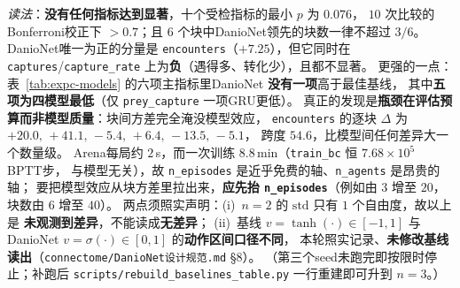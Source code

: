 \begin{table}[H]
  \centering
  \caption{块内置换检验（块 $=$ (seed, episode) 共 $6$ 个；同块内四模型共享同一出生布局与
  猎物游走，故\textbf{块内置换模型标签}在强零假设下精确；$2\times10^{4}$ 次重抽样，
  $p$ 为蒙特卡洛估计，同量级差异属抽样噪声）。
  $\Delta$ 为DanioNet减去其余三基线的均值；\emph{更高的块}为 $6$ 块中DanioNet领先的块数。}
  \label{tab:expc}
  \footnotesize
\setlength{\tabcolsep}{3pt}
\end{table}

\emph{读法}：\textbf{没有任何指标达到显著}，十个受检指标的最小 $p$ 为 $0.076$，
$10$ 次比较的Bonferroni校正下 $>0.7$；且 $6$ 个块中DanioNet领先的块数一律不超过 $3/6$。
DanioNet唯一为正的分量是 \texttt{encounters}（$+7.25$），但它同时在
\texttt{captures}/\texttt{capture\_rate} 上为\textbf{负}（遇得多、转化少），且都不显著。
更强的一点：表~\ref{tab:expc-models} 的六项主指标里DanioNet \textbf{没有一项}高于最佳基线，
其中\textbf{五项为四模型最低}（仅 \texttt{prey\_capture} 一项GRU更低）。
真正的发现是\textbf{瓶颈在评估预算而非模型质量}：块间方差完全淹没模型效应，
\texttt{encounters} 的逐块 $\Delta$ 为 $+20.0,\,+41.1,\,-5.4,\,+6.4,\,-13.5,\,-5.1$，
跨度 $54.6$，比模型间任何差异大一个数量级。
Arena每局约 $2$\,s，而一次训练 $8.8$\,min（\texttt{train\_bc} 恒 $7.68\times10^{5}$ BPTT步，
与模型无关），故 \texttt{n\_episodes} 是近乎免费的轴、\texttt{n\_agents} 是昂贵的轴；
要把模型效应从块方差里拉出来，\textbf{应先抬 \texttt{n\_episodes}}（例如由 $3$ 增至 $20$，块数由 $6$ 增至 $40$）。
两点须照实声明：(i)~$n=2$ 的 $\mathrm{std}$ 只有 $1$ 个自由度，故以上是
\textbf{未观测到差异}，不能读成\textbf{无差异}；
(ii)~基线 $v=\tanh(\cdot)\in[-1,1]$ 与DanioNet $v=\sigma(\cdot)\in[0,1]$ 的\textbf{动作区间口径不同}，
本轮照实记录、\textbf{未修改基线读出}（\texttt{connectome/DanioNet设计规范.md} \S8）。
（第三个seed未跑完即按限时停止；补跑后 \texttt{scripts/rebuild\_baselines\_table.py} 一行重建即可升到 $n=3$。）

